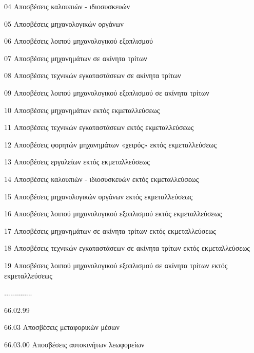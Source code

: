 \documentclass[A4,10pt,greek]{book}
\begin{document}
                               04   Αποσβέσεις καλουπιών - ιδιοσυσκευών

                               05   Αποσβέσεις μηχανολογικών οργάνων

                               06   Αποσβέσεις λοιπού μηχανολογικού εξοπλισμού

                               07   Αποσβέσεις μηχανημάτων σε ακίνητα τρίτων

                               08   Αποσβέσεις τεχνικών εγκαταστάσεων σε ακίνητα τρίτων

                               09   Αποσβέσεις λοιπού μηχανολογικού εξοπλισμού
                                       σε ακίνητα τρίτων

                               10   Αποσβέσεις μηχανημάτων εκτός εκμεταλλεύσεως

                               11   Αποσβέσεις τεχνικών εγκαταστάσεων εκτός εκμεταλλεύσεως

                               12   Αποσβέσεις φορητών μηχανημάτων «χειρός» εκτός
                                       εκμεταλλεύσεως

                               13   Αποσβέσεις εργαλείων εκτός εκμεταλλεύσεως

                               14   Αποσβέσεις καλουπιών - ιδιοσυσκευών εκτός εκμεταλλεύσεως

                               15   Αποσβέσεις μηχανολογικών οργάνων εκτός εκμεταλλεύσεως

                               16   Αποσβέσεις λοιπού μηχανολογικού εξοπλισμού εκτός
                                       εκμεταλλεύσεως

                               17   Αποσβέσεις μηχανημάτων σε ακίνητα τρίτων
                                       εκτός εκμεταλλεύσεως

                               18   Αποσβέσεις τεχνικών εγκαταστάσεων σε ακίνητα τρίτων
                                       εκτός εκμεταλλεύσεως

                               19   Αποσβέσεις λοιπού μηχανολογικού εξοπλισμού σε ακίνητα
                                       τρίτων εκτός εκμεταλλεύσεως

                     ..............

                     66.02.99

        66.03   Αποσβέσεις μεταφορικών μέσων

                     66.03.00   Αποσβέσεις αυτοκινήτων λεωφορείων
\end{document}
